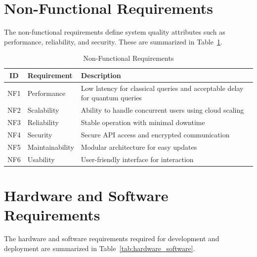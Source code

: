 \section{Non-Functional Requirements}

The non-functional requirements define system quality attributes such as performance, reliability, and security. These are summarized in Table~\ref{tab:nonfunctional_requirements}.

\begin{table}[htbp]
    \vspace{-1em}
    \centering
    \caption{Non-Functional Requirements}
    \label{tab:nonfunctional_requirements}
    \begin{tabular}{|c|p{5cm}|p{6cm}|}
        \hline
        \textbf{ID} & \textbf{Requirement} & \textbf{Description} \\
        \hline
        NF1 & Performance & Low latency for classical queries and acceptable delay for quantum queries \\
        \hline
        NF2 & Scalability & Ability to handle concurrent users using cloud scaling \\
        \hline
        NF3 & Reliability & Stable operation with minimal downtime \\
        \hline
        NF4 & Security & Secure API access and encrypted communication \\
        \hline
        NF5 & Maintainability & Modular architecture for easy updates \\
        \hline
        NF6 & Usability & User-friendly interface for interaction \\
        \hline
    \end{tabular}
\end{table}

\section{Hardware and Software Requirements}

The hardware and software requirements required for development and deployment are summarized in Table~\ref{tab:hardware_software}.

